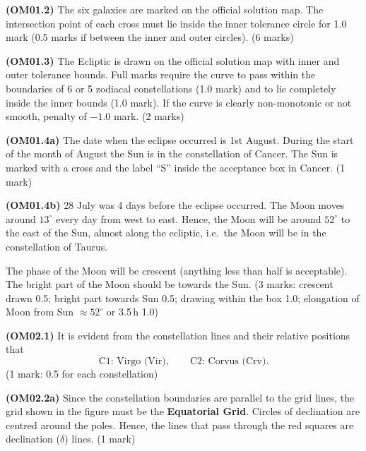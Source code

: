 
\textbf{(OM01.2)} The six galaxies are marked on the official solution map.
The intersection point of each cross must lie inside the inner tolerance
circle for 1.0 mark (0.5 marks if between the inner and outer circles).
\hfill(6 marks)


\textbf{(OM01.3)} The Ecliptic is drawn on the official solution map with
inner and outer tolerance bounds. Full marks require the curve to pass
within the boundaries of 6 or 5 zodiacal constellations (1.0 mark) and to
lie completely inside the inner bounds (1.0 mark). If the curve is clearly
non-monotonic or not smooth, penalty of $-1.0$ mark. \hfill(2 marks)


\textbf{(OM01.4a)} The date when the eclipse occurred is 1st August. During
the start of the month of August the Sun is in the constellation of Cancer.
The Sun is marked with a cross and the label ``S'' inside the acceptance box
in Cancer. \hfill(1 mark)

\textbf{(OM01.4b)} 28 July was 4 days before the eclipse occurred. The Moon
moves around $13^\circ$ every day from west to east. Hence, the Moon will be
around $52^\circ$ to the east of the Sun, almost along the ecliptic, i.e.\
the Moon will be in the constellation of Taurus.

The phase of the Moon will be crescent (anything less than half is
acceptable). The bright part of the Moon should be towards the Sun.
\hfill(3 marks: crescent drawn 0.5; bright part towards Sun 0.5; drawing
within the box 1.0; elongation of Moon from Sun $\approx 52^\circ$ or
3.5\,h 1.0)


\textbf{(OM02.1)} It is evident from the constellation lines and their
relative positions that
\[ \text{C1: Virgo (Vir)}, \qquad \text{C2: Corvus (Crv)}. \]
\hfill(1 mark: 0.5 for each constellation)

\textbf{(OM02.2a)} Since the constellation boundaries are parallel to the
grid lines, the grid shown in the figure must be the \textbf{Equatorial
Grid}. Circles of declination are centred around the poles. Hence, the
lines that pass through the red squares are declination ($\delta$) lines.
\hfill(1 mark)

